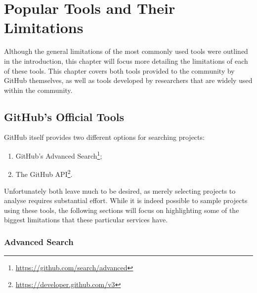 \chapter{Popular Tools and Their Limitations}\label{ch:2}

Although the general limitations of the most commonly used tools were outlined in the introduction, this chapter will focus more detailing the limitations of each of these tools.
This chapter covers both tools provided to the community by GitHub themselves, as well as tools developed by researchers that are widely used within the community.

\section{GitHub's Official Tools}

GitHub itself provides two different options for searching projects:
\begin{enumerate}
    \item GitHub's Advanced Search\footnote{\url{https://github.com/search/advanced}};
    \item The GitHub API\footnote{\url{https://developer.github.com/v3}}.
\end{enumerate}
Unfortunately both leave much to be desired, as merely selecting projects to analyse requires substantial effort.
While it is indeed possible to sample projects using these tools, the following sections will focus on highlighting some of the biggest limitations that these particular services have.

\subsection{Advanced Search}

